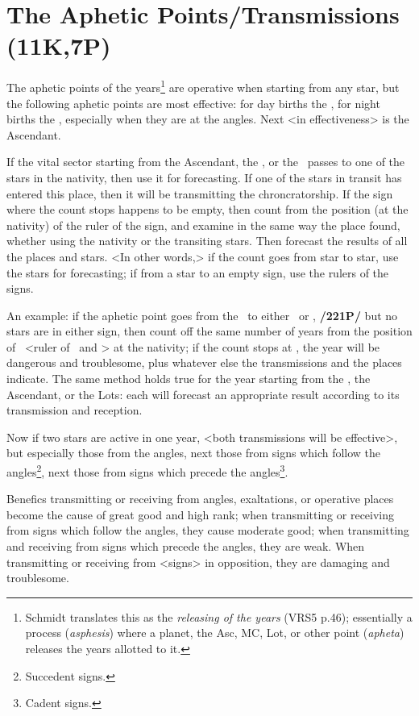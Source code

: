 \section{The Aphetic Points/Transmissions (11K,7P)}

The aphetic points of the years\footnote{Schmidt translates this as the \textsl{releasing of the years} (VRS5 p.46); essentially a process (\textsl{asphesis}) where a planet, the Asc, MC, Lot, or other point (\textsl{apheta}) releases the years allotted to it.}  are operative when starting from any star, but the following aphetic points are most effective: for day births the \Sun, for night births the \Moon, especially when they are at the
angles. Next <in effectiveness> is the Ascendant. 

If \mndl the vital sector starting from the Ascendant, the \Moon, or the \Sun\, passes to one of the stars in the nativity, then use it for forecasting. If one of the stars in transit has entered this place, then it will be transmitting the chroncratorship. If the sign where the count stops happens to be empty, then count from the position (at the nativity) of the ruler of the sign, and examine in the same way the place found, whether using the nativity or the transiting stars. Then forecast the results of all the places and stars. <In other words,> if the count goes from star to star, use the stars for forecasting; if
from a star to an empty sign, use the rulers of the signs.

An example: if the aphetic point goes from the \Moon\, to either \Aries\, or \Scorpio, \textbf{/221P/} but no stars are
in either sign, then count off the same number of years from the position of \Mars\, <ruler of \Aries\, and \Scorpio> at the nativity; if the count stops at \Saturn, the year will be dangerous and troublesome, plus whatever else the transmissions and the places indicate. The same method holds true for the year starting from the \Sun, the Ascendant, or the Lots: each will forecast an appropriate result according to its transmission and reception.

Now if two stars are active in one year, <both transmissions will be effective>, but especially those from the angles, next those from signs which follow the angles\footnote{Succedent signs.}, next those from signs which precede the angles\footnote{Cadent signs.}. 

Benefics transmitting or receiving from angles, exaltations, or operative places become the cause of great good and high rank; when transmitting or receiving from signs which follow the angles, they cause moderate good; when transmitting and receiving from signs which precede the angles, they are weak. When transmitting or receiving from <signs> in opposition, they are damaging and troublesome. 

